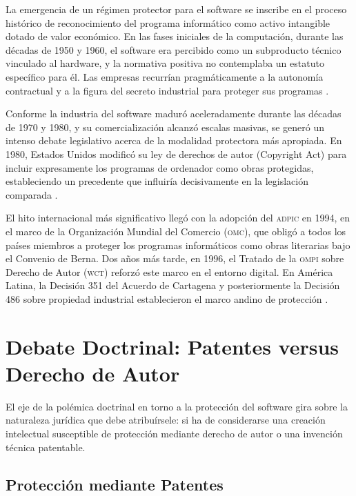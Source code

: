 \documentclass[11pt,a4paper]{report}
\begin{document}
La emergencia de un régimen protector para el software se inscribe en el proceso histórico de reconocimiento del programa informático como activo intangible dotado de valor económico. En las fases iniciales de la computación, durante las décadas de 1950 y 1960, el software era percibido como un subproducto técnico vinculado al hardware, y la normativa positiva no contemplaba un estatuto específico para él. Las empresas recurrían pragmáticamente a la autonomía contractual y a la figura del secreto industrial para proteger sus programas \citep{ompi2024}.

Conforme la industria del software maduró aceleradamente durante las décadas de 1970 y 1980, y su comercialización alcanzó escalas masivas, se generó un intenso debate legislativo acerca de la modalidad protectora más apropiada. En 1980, Estados Unidos modificó su ley de derechos de autor (Copyright Act) para incluir expresamente los programas de ordenador como obras protegidas, estableciendo un precedente que influiría decisivamente en la legislación comparada \citep{euipo2022}.

El hito internacional más significativo llegó con la adopción del \textsc{adpic} en 1994, en el marco de la Organización Mundial del Comercio (\textsc{omc}), que obligó a todos los países miembros a proteger los programas informáticos como obras literarias bajo el Convenio de Berna. Dos años más tarde, en 1996, el Tratado de la \textsc{ompi} sobre Derecho de Autor (\textsc{wct}) reforzó este marco en el entorno digital. En América Latina, la Decisión 351 del Acuerdo de Cartagena y posteriormente la Decisión 486 sobre propiedad industrial establecieron el marco andino de protección \citep{omc1994, ompi1996, indecopi2023}.

\section{Debate Doctrinal: Patentes versus Derecho de Autor}

El eje de la polémica doctrinal en torno a la protección del software gira sobre la naturaleza jurídica que debe atribuírsele: si ha de considerarse una creación intelectual susceptible de protección mediante derecho de autor o una invención técnica patentable.

\subsection{Protección mediante Patentes}
\end{document}
